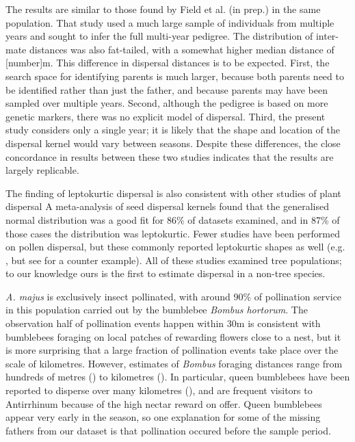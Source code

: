 \documentclass[10pt, a4paper, twocolumn]{article} %
\begin{document}
The results are similar to those found by Field et al. (in prep.) in the same population.
That study used a much large sample of individuals from multiple years and sought to infer the full multi-year pedigree.
The distribution of inter-mate distances was also fat-tailed, with a somewhat higher median distance of [number]m.
This difference in dispersal distances is to be expected.
First, the search space for identifying parents is much larger, because both parents need to be identified rather than just the father, and because parents may have been sampled over multiple years.
Second, although the pedigree is based on more genetic markers, there was no explicit model of dispersal.
Third, the present study considers only a single year; it is likely that the shape and location of the dispersal kernel would vary between seasons.
Despite these differences, the close concordance in results between these two studies indicates that the results are largely replicable.

The finding of leptokurtic dispersal is also consistent with other studies of plant dispersal
A meta-analysis of seed dispersal kernels found that the generalised normal distribution was a good fit for 86\% of datasets examined, and in 87\% of those cases the distribution was leptokurtic.
Fewer studies have been performed on pollen dispersal, but these commonly reported leptokurtic shapes as well (e.g. \cite{adams1992using, austerlitz2004using, robledo2005patterns, klein2008pollen, burczyk2019patterns}, but see \cite{ottewell2012pollen} for a counter example).
All of these studies examined tree populations; to our knowledge ours is the first to estimate dispersal in a non-tree species.

\textit{A. majus} is exclusively insect pollinated, with around 90\% of pollination service in this population carried out by the bumblebee \textit{Bombus hortorum}.
The observation half of pollination events happen within 30m is consistent with bumblebees foraging on local patches of rewarding flowers close to a nest, but it is more surprising that a large fraction of pollination events take place over the scale of kilometres.
However, estimates of \textit{Bombus} foraging distances range from hundreds of metres (\cite{osborne1999landscape, wolf2008foraging}) to kilometres (\cite{osborne2008bumblebee, hagen2011space}).
In particular, queen bumblebees have been reported to disperse over many kilometres (\cite{lepais2010estimation}), and are frequent visitors to Antirrhinum because of the high nectar reward on offer.
Queen bumblebees appear very early in the season, so one explanation for some of the missing fathers from our dataset is that pollination occured before the sample period.
\end{document}

